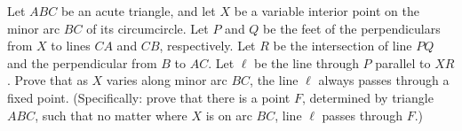 Let $ABC$ be an acute triangle, and let $X$ be a variable interior point on the minor arc $BC$ of its circumcircle. Let $P$ and $Q$ be the feet of the perpendiculars from $X$ to lines $CA$ and $CB$, respectively. Let $R$ be the intersection of line $PQ$ and the perpendicular from $B$ to $AC$. Let $\ell$ be the line through $P$ parallel to $XR$. Prove that as $X$ varies along minor arc $BC$, the line $\ell$ always passes through a fixed point. (Specifically: prove that there is a point $F$, determined by triangle $ABC$, such that no matter where $X$ is on arc $BC$, line $\ell$ passes through $F$.)